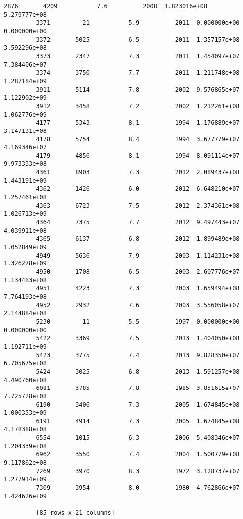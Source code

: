 \documentclass[11pt]{article}
\begin{document}
\begin{Verbatim}[commandchars=\\\{\}]
         2876       4209           7.6          2008  1.823016e+08  5.279777e+08  
         3371         21           5.9          2011  0.000000e+00  0.000000e+00  
         3372       5025           6.5          2011  1.357157e+08  3.592296e+08  
         3373       2347           7.3          2011  1.454097e+07  7.384406e+07  
         3374       3750           7.7          2011  1.211748e+08  1.287184e+09  
         3911       5114           7.8          2002  9.576865e+07  1.122902e+09  
         3912       3458           7.2          2002  1.212261e+08  1.062776e+09  
         4177       5343           8.1          1994  1.176889e+07  3.147131e+08  
         4178       5754           8.4          1994  3.677779e+07  4.169346e+07  
         4179       4856           8.1          1994  8.091114e+07  9.973333e+08  
         4361       8903           7.3          2012  2.089437e+08  1.443191e+09  
         4362       1426           6.0          2012  6.648210e+07  1.257461e+08  
         4363       6723           7.5          2012  2.374361e+08  1.026713e+09  
         4364       7375           7.7          2012  9.497443e+07  4.039911e+08  
         4365       6137           6.8          2012  1.899489e+08  1.052849e+09  
         4949       5636           7.9          2003  1.114231e+08  1.326278e+09  
         4950       1708           6.5          2003  2.607776e+07  1.134483e+08  
         4951       4223           7.3          2003  1.659494e+08  7.764193e+08  
         4952       2932           7.6          2003  3.556058e+07  2.144884e+08  
         5230         11           5.5          1997  0.000000e+00  0.000000e+00  
         5422       3369           7.5          2013  1.404050e+08  1.192711e+09  
         5423       3775           7.4          2013  9.828350e+07  6.705675e+08  
         5424       3025           6.8          2013  1.591257e+08  4.490760e+08  
         6081       3785           7.8          1985  3.851615e+07  7.725728e+08  
         6190       3406           7.3          2005  1.674845e+08  1.000353e+09  
         6191       4914           7.3          2005  1.674845e+08  4.178388e+08  
         6554       1015           6.3          2006  5.408346e+07  1.204339e+08  
         6962       3550           7.4          2004  1.500779e+08  9.117862e+08  
         7269       3970           8.3          1972  3.128737e+07  1.277914e+09  
         7309       3954           8.0          1980  4.762866e+07  1.424626e+09  
         
         [85 rows x 21 columns]
\end{Verbatim}
            
\end{document}
